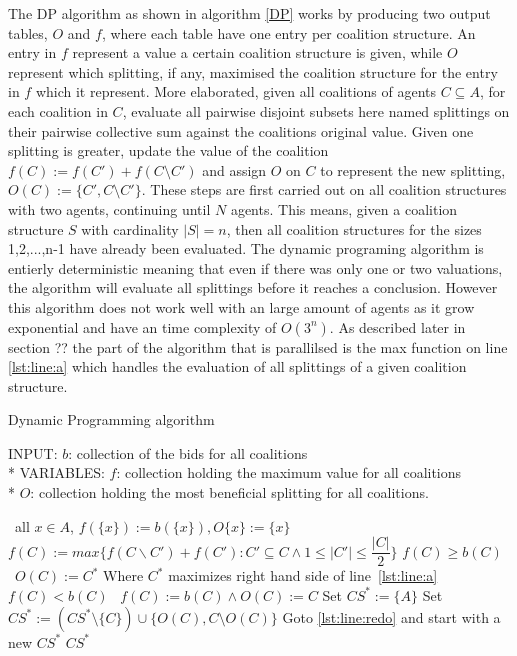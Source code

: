 \documentclass{llncs}
\begin{document}
The DP algorithm as shown in algorithm \ref{DP} works by producing two output tables, $O$ and $f$, 
where each table have one entry per coalition structure. 
An entry in $f$ represent a value a certain coalition structure is given, 
while $O$ represent which splitting, if any, maximised the coalition structure for the entry in $f$ which it represent.
More elaborated, given all coalitions of agents $C\subseteq A$, for each coalition in $C$, evaluate all
pairwise disjoint subsets here named splittings on their pairwise collective sum against the coalitions
original value. Given one splitting is greater, update the value of the coalition $f(C) := f(C') + f(C\setminus C')$
and assign $O$ on $C$ to represent the new splitting, $O(C) := \{C',C\setminus C'\}$. These steps are first carried out
on all coalition structures with two agents, continuing until $N$ agents. 
This means, given a coalition structure $S$ with cardinality $|S| = n$, then all coalition structures
for the sizes 1,2,...,n-1 have already been evaluated. The dynamic programing algorithm is entierly deterministic meaning
that even if there was only one or two valuations, the algorithm will evaluate all splittings before it reaches a conclusion.
However this algorithm does not work well with an large amount of agents as it grow exponential and have an time complexity of $O(3^n)$.
As described later in section ?? the part of the algorithm that is parallilsed is the max function on line \ref{lst:line:a}
which handles the evaluation of all splittings of a given coalition structure.

\begin{algorithm}
\caption{Dynamic Programming algorithm \label{DP}}
INPUT: $b$: collection of the bids for all coalitions\\*
VARIABLES: $f$: collection holding the maximum value for all coalitions\\*
$O$: collection holding the most beneficial splitting for all coalitions.
\begin{algorithmic}[1]
\STATE\algorithmicfor\ all $x \in A$, \algorithmicdo  $f(\{x\}):= b(\{x\}),O\{x\}:= \{x\}$ \algorithmicendfor
{}
\STATE $f(C) := max\{f(C\backslash C')+f(C'):C'\subseteq C \wedge 1 \leq \vert C' \vert \leq \dfrac{\vert C \vert}{2}\}$ \label{lst:line:a}
\STATE\algorithmicif $f(C) \geq b(C)$ \algorithmicthen\ $O(C) := C^{*}$ \hfill Where $C^{*}$ maximizes right hand side of line~\ref{lst:line:a} \algorithmicendif
\STATE\algorithmicif $f(C) < b(C)$ \algorithmicthen\ $f(C) := b(C)\wedge O(C) := C$ \algorithmicendif
\ENDFOR
\ENDFOR
\STATE Set $CS^* := \{A\}$
 \label{lst:line:redo}
\STATE Set $CS^* := (CS^*\setminus \{C\})\cup \{O(C),C\setminus O(C)\}$ 
\STATE Goto \ref{lst:line:redo} and start with a new $CS^*$
\ENDIF
\ENDFOR
\RETURN $CS^*$
\end{algorithmic}
\end{algorithm}
\end{document}
